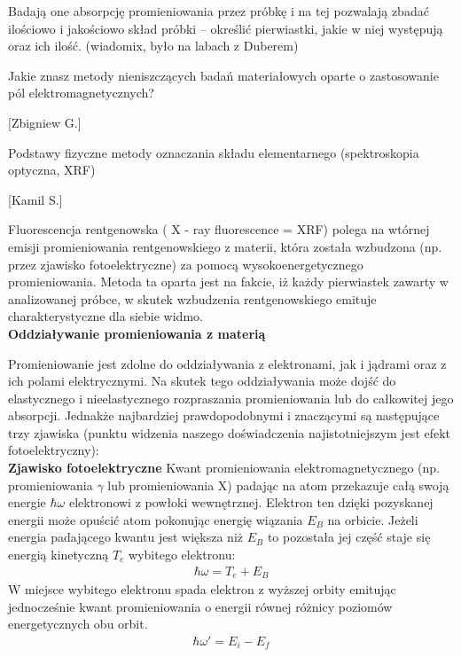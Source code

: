 \documentclass{article}
\begin{document}
\begin{enumerate}
Badają one absorpcję promieniowania przez próbkę i na tej pozwalają zbadać ilościowo i jakościowo skład próbki – określić pierwiastki, jakie w niej występują oraz ich ilość. (wiadomix, było na labach z Duberem)



{\Large \bf  \item Jakie znasz metody nieniszczących badań materiałowych oparte o zastosowanie
pól elektromagnetycznych?} [Zbigniew G.]

{\Large \bf  \item Podstawy fizyczne metody oznaczania składu elementarnego (spektroskopia
optyczna, XRF)} [Kamil S.]



Fluorescencja rentgenowska ( X - ray fluorescence = XRF) polega na wtórnej emisji promieniowania rentgenowskiego z materii, która została wzbudzona (np. przez zjawisko fotoelektryczne) za pomocą wysokoenergetycznego promieniowania. Metoda ta oparta jest na fakcie, iż każdy pierwiastek zawarty w analizowanej próbce, w skutek wzbudzenia rentgenowskiego emituje charakterystyczne dla siebie widmo.\\

{\bf Oddziaływanie promieniowania z materią}

Promieniowanie jest zdolne do oddziaływania z elektronami, jak i jądrami oraz z ich polami elektrycznymi. Na skutek tego oddziaływania może dojść do elastycznego i nieelastycznego rozpraszania promieniowania lub do całkowitej jego absorpcji. Jednakże najbardziej prawdopodobnymi i znaczącymi są następujące trzy zjawiska (punktu widzenia naszego doświadczenia najistotniejszym jest efekt fotoelektryczny):\\

{\bf Zjawisko fotoelektryczne}
Kwant promieniowania elektromagnetycznego (np. promieniowania $\gamma$ lub promieniowania X) padając na atom przekazuje całą swoją energie $\hbar\omega$ elektronowi z powłoki wewnętrznej. Elektron ten dzięki pozyskanej energii może opuścić atom pokonując energię wiązania $E_B$ na orbicie. Jeżeli energia padającego kwantu jest większa niż $E_B$ to pozostała jej część staje się energią kinetyczną $T_e$ wybitego elektronu:
\begin{gather*}
\hbar\omega=T_e+E_B
\end{gather*}
W miejsce wybitego elektronu spada elektron z wyższej orbity emitując jednocześnie kwant promieniowania o energii równej różnicy poziomów energetycznych obu orbit.
\begin{gather*}
\hbar\omega'=E_i-E_f
\end{gather*}


\end{enumerate}
\end{document}
